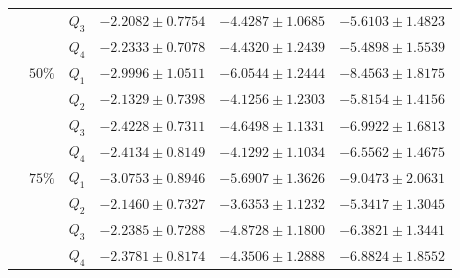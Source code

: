 \begin{table}[h]
{\begin{tabular}{@{}ccclll@{}}
 &  & $Q_{3}$ & $-2.2082 \pm 0.7754$ & $-4.4287 \pm 1.0685$ & $-5.6103 \pm 1.4823$ \\
 &  & $Q_{4}$ & $-2.2333 \pm 0.7078$ & $-4.4320 \pm 1.2439$ & $-5.4898 \pm 1.5539$ \\ \cmidrule(l){2-6} 
 & $50\%$ & $Q_{1}$ & $-2.9996 \pm 1.0511$ & $-6.0544 \pm 1.2444$ & $-8.4563 \pm 1.8175$ \\
 &  & $Q_{2}$ & $\mathbf{-2.1329 \pm 0.7398}$ & $\mathbf{-4.1256 \pm 1.2303}$ & $\mathbf{-5.8154 \pm 1.4156}$ \\
 &  & $Q_{3}$ & $-2.4228 \pm 0.7311$ & $-4.6498 \pm 1.1331$ & $-6.9922 \pm 1.6813$ \\
 &  & $Q_{4}$ & $-2.4134 \pm 0.8149$ & $-4.1292 \pm 1.1034$ & $-6.5562 \pm 1.4675$ \\ \cmidrule(l){2-6} 
 & $75\%$ & $Q_{1}$ & $-3.0753 \pm 0.8946$ & $-5.6907 \pm 1.3626$ & $-9.0473 \pm 2.0631$ \\
 &  & $Q_{2}$ & $\mathbf{-2.1460 \pm 0.7327}$ & $\mathbf{-3.6353 \pm 1.1232}$ & $\mathbf{-5.3417 \pm 1.3045}$ \\
 &  & $Q_{3}$ & $-2.2385 \pm 0.7288$ & $-4.8728 \pm 1.1800$ & $-6.3821 \pm 1.3441$ \\
 &  & $Q_{4}$ & $-2.3781 \pm 0.8174$ & $-4.3506 \pm 1.2888$ & $-6.8824 \pm 1.8552$ \\ \bottomrule
\end{tabular}%
}
\end{table}

